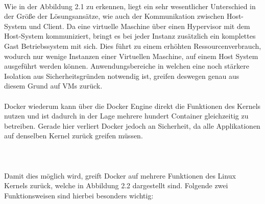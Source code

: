 \documentclass[12pt,toc=bib,toc=listof]{scrreprt}
\begin{document}
\\
Wie in der Abbildung 2.1 zu erkennen, liegt ein sehr wesentlicher Unterschied in der Größe der Lösungsansätze, wie auch der Kommunikation zwischen Host-System und Client.
Da eine virtuelle Maschine über einen Hypervisor mit dem Host-System kommuniziert, bringt es bei jeder Instanz zusätzlich ein komplettes Gast Betriebssystem mit sich.
Dies führt zu einem erhöhten Ressourcenverbrauch, wodurch nur wenige Instanzen einer Virtuellen Maschine, auf einem Host System ausgeführt werden können.
Anwendungsbereiche in welchen eine noch stärkere Isolation aus Sicherheitsgründen notwendig ist, greifen deswegen genau aus diesem Grund auf VMs zurück.\\
\\
Docker wiederum kann über die Docker Engine direkt die Funktionen des Kernels nutzen und ist dadurch in der Lage mehrere hundert Container gleichzeitig zu betreiben.
Gerade hier verliert Docker jedoch an Sicherheit, da alle Applikationen auf denselben Kernel zurück greifen müssen.\\
\\
\\
\\
Damit dies möglich wird, greift Docker auf mehrere Funktionen des Linux Kernels zurück, welche in Abbildung 2.2 dargestellt sind.
Folgende zwei Funktionsweisen sind hierbei besonders wichtig:
\end{document}
